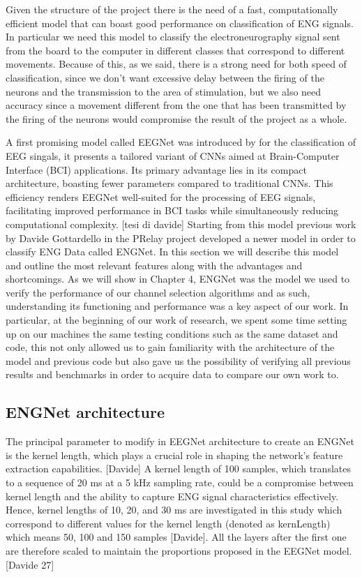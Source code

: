 \documentclass{Configuration_Files/PoliMi3i_thesis}
\begin{document}
Given the structure of the project there is the need of a fast, computationally efficient model that can boast good performance on classification of ENG signals.
In particular we need this model to classify the electroneurography signal sent from the board to the computer in different classes that correspond to different movements.
Because of this, as we said, there is a strong need for both speed of classification, since we don't want excessive delay between the firing of the neurons and the transmission to the area of stimulation, but we also need accuracy since a movement different from the one that has been transmitted by the firing of the neurons would compromise the result of the project as a whole.

A first promising model called EEGNet was introduced by \cite{lawhernEEGNetCompactConvolutional2018} for the classification of EEG singals, it presents a tailored variant of CNNs aimed at Brain-Computer Interface (BCI) applications. Its primary advantage lies in its compact architecture, boasting fewer parameters compared to traditional CNNs. This efficiency renders EEGNet well-suited for the processing of EEG signals, facilitating improved performance in BCI tasks while simultaneously reducing computational complexity. [tesi di davide]
Starting from this model previous work by Davide Gottardello in the PRelay project developed a newer model in order to classify ENG Data called ENGNet.
In this section we will describe this model and outline the most relevant features along with the advantages and shortcomings.
As we will show in Chapter 4, ENGNet was the model we used to verify the performance of our channel selection algorithms and as such, understanding its functioning and performance was a key aspect of our work.
In particular, at the beginning of our work of research, we spent some time setting up on our machines the same testing conditions such as the same dataset and code, this not only allowed us to gain familiarity with the architecture of the model and previous code but also gave us the possibility of verifying all previous results and benchmarks in order to acquire data to compare our own work to. 

\subsection{ENGNet architecture}

The principal parameter to modify in EEGNet architecture to create an ENGNet is the kernel length, which plays a crucial role in shaping the network’s feature extraction capabilities. [Davide]
A kernel length of 100 samples, which translates to a sequence of 20 ms at a 5 kHz sampling rate, could be a compromise between kernel length and the ability to capture ENG signal characteristics effectively. Hence, kernel lengths of 10, 20, and 30 ms are investigated in this study which correspond to different values for the kernel length (denoted as kernLength) which means 50, 100 and 150 samples [Davide].
All the layers after the first one are therefore scaled to maintain the proportions proposed in the EEGNet model. [Davide 27]
\end{document}
